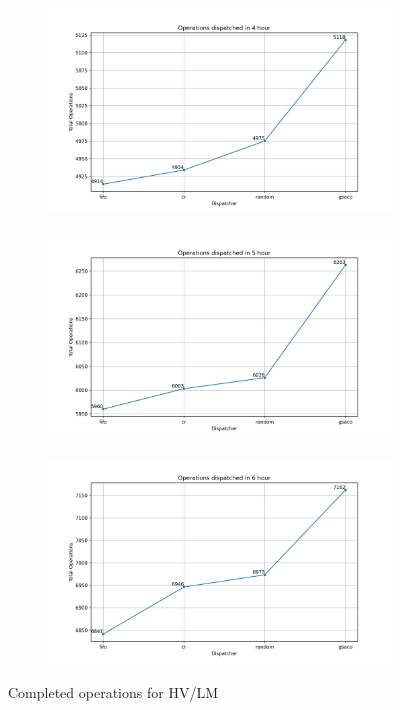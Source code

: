 \begin{figure}[t]
\begin{subfigure}{0.32\textwidth}
	\end{subfigure}
	\begin{subfigure}{0.32\textwidth}
		\includegraphics[width=\textwidth]{HVLM/total_operations_14400s.png}
	\end{subfigure}\hfill
	\begin{subfigure}{0.32\textwidth}
		\includegraphics[width=\textwidth]{HVLM/total_operations_18000s.png}
	\end{subfigure}\hfill
	\begin{subfigure}{0.32\textwidth}
		\includegraphics[width=\textwidth]{HVLM/total_operations_21600s.png}
	\end{subfigure}
	\caption{Completed operations for HV/LM}
	\label{fig:totalopsHVLM}
\end{figure}

